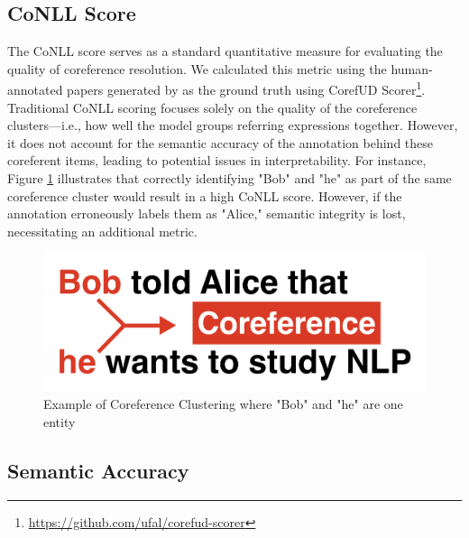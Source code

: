 \subsection{CoNLL Score}
The CoNLL score serves as a standard quantitative measure for evaluating the quality of coreference resolution. We calculated this metric using the human-annotated papers generated by \citet{asakura2022building} as the ground truth using CorefUD Scorer\footnote{\url{https://github.com/ufal/corefud-scorer}}. Traditional CoNLL scoring focuses solely on the quality of the coreference clusters—i.e., how well the model groups referring expressions together. However, it does not account for the semantic accuracy of the annotation behind these coreferent items, leading to potential issues in interpretability. For instance, Figure \ref{fig:coreference} illustrates that correctly identifying "Bob" and "he" as part of the same coreference cluster would result in a high CoNLL score. However, if the annotation erroneously labels them as "Alice," semantic integrity is lost, necessitating an additional metric.

\begin{figure}[htpb]
  \centering
  \begin{minipage}{\textwidth}
    \centering
    \includegraphics[width=14cm]{images/coreference.png}
    \caption[Example for coreference]{Example of Coreference Clustering where "Bob" and "he" are one entity \citep{asakura2022building}\footnotemark}
    \label{fig:coreference}
  \end{minipage}
\end{figure}

\subsection{Semantic Accuracy}

